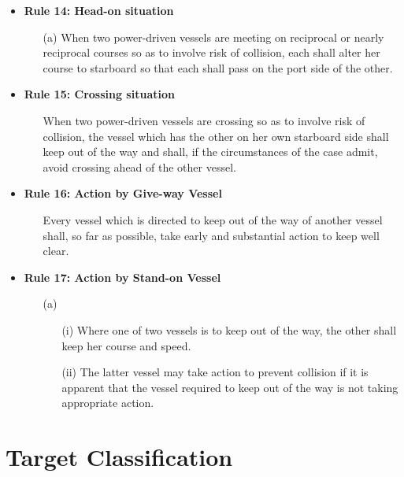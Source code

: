 \begin{itemize}
\begin{enumerate}
        \end{enumerate}
    \item \textbf{Rule 14: Head-on situation}
        \begin{enumerate}
            \item[(a)] When two power-driven vessels are meeting on reciprocal or nearly reciprocal courses so as to involve risk of collision, each shall alter her course to starboard so that each shall pass on the port side of the other.
        \end{enumerate}
    \item \textbf{Rule 15: Crossing situation}
    \begin{enumerate}
        \item[] When two power-driven vessels are crossing so as to involve risk of collision, the vessel which has the other on her own starboard side shall keep out of the way and shall, if the circumstances of the case admit, avoid crossing ahead of the other vessel.
    
    \end{enumerate}
    \item \textbf{Rule 16: Action by Give-way Vessel}
    \begin{enumerate}
        \item [] Every vessel which is directed to keep out of the way of another vessel shall, so far as possible, take early and substantial action to keep well clear.
    \end{enumerate}
    \item \textbf{Rule 17: Action by Stand-on Vessel}
    \begin{enumerate}
        \item[(a)]
        \begin{enumerate}
            \item[(i)] Where one of two vessels is to keep out of the way, the other shall keep her course and speed.
            \item[(ii)] The latter vessel may take action to prevent collision if it is apparent that the vessel required to keep out of the way is not taking appropriate action.
        \end{enumerate}
    \end{enumerate}
\end{itemize}

\section{Target Classification}

